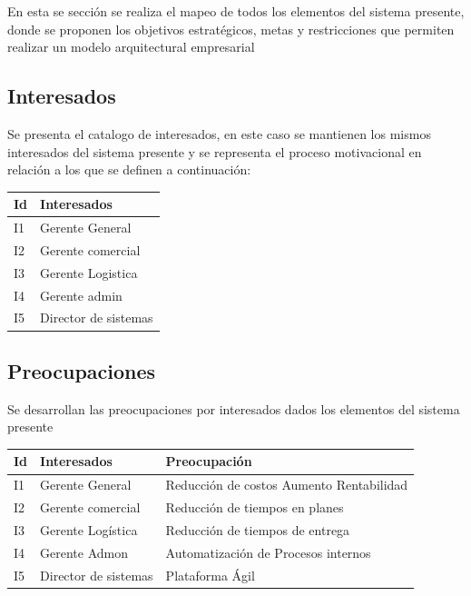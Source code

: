 \documentclass[12pt]{article}
\begin{document}
En esta se sección se realiza el mapeo de todos los elementos del sistema presente, donde se proponen los objetivos estratégicos, metas y restricciones que permiten realizar un modelo arquitectural empresarial






\subsection{Interesados} Se presenta el catalogo de interesados, en este caso se mantienen los mismos interesados del sistema presente y se representa el proceso motivacional en relación a los que se definen a continuación:

\begin{table}[H]
\centering
\begin{tabular}{|l|l|}
\hline
\textbf{Id} & \textbf{Interesados} \\ \hline
I1 & Gerente General \\ \hline
I2 & Gerente comercial \\ \hline
I3 & Gerente Logistica \\ \hline
I4 & Gerente admin \\ \hline
I5 & Director de sistemas \\ \hline
\end{tabular}
\end{table}





\subsection{Preocupaciones} Se desarrollan las preocupaciones por interesados dados los elementos del sistema presente

\begin{table}[H]
\centering
\begin{tabular}{|l|l|l|}
\hline
\textbf{Id} & \textbf{Interesados} & \textbf{Preocupación} \\ \hline
I1 & Gerente General & Reducción de costos Aumento Rentabilidad \\ \hline
I2 & Gerente comercial & Reducción de tiempos en planes \\ \hline
I3 & Gerente Logística & Reducción de tiempos de entrega \\ \hline
I4 & Gerente Admon & Automatización de Procesos internos
\\ \hline
I5 & Director de sistemas & Plataforma Ágil 
\\ \hline
\end{tabular}
\end{table}
\end{document}
